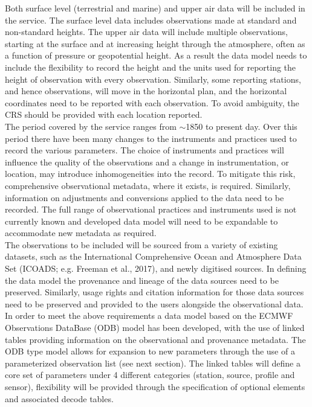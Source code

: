 \documentclass[a4paper]{article}
\begin{document}
Both surface level (terrestrial and marine) and upper air data will be included in the service.  The surface level data includes observations made at standard and non-standard heights. The upper air data will include multiple observations, starting at the surface and at increasing height through the atmosphere, often as a function of pressure or geopotential height. As a result the data model needs to include the flexibility to record the height and the units used for reporting the height of observation with every observation. Similarly, some reporting stations, and hence observations, will move in the horizontal plan, and the horizontal coordinates need to be reported with each observation. To avoid ambiguity, the CRS should be provided with each location reported.\\

The period covered by the service ranges from $\sim$1850 to present day. Over this period there have been many changes to the instruments and practices used to record the various parameters. The choice of instruments and practices will influence the quality of the observations and a change in instrumentation, or location, may introduce inhomogeneities into the record.  To mitigate this risk, comprehensive observational metadata, where it exists, is required. Similarly, information on adjustments and conversions applied to the data need to be recorded. The full range of observational practices and instruments used is not currently known and developed data model will need to be expandable to accommodate new metadata as required.\\

The observations to be included will be sourced from a variety of existing datasets, such as the International Comprehensive Ocean and Atmosphere Data Set (ICOADS; e.g. Freeman et al., 2017), and newly digitised sources. In defining the data model the provenance and lineage of the data sources need to be preserved. Similarly, usage rights and citation information for those data sources need to be preserved and provided to the users alongside the observational data.\\

In order to meet the above requirements a data model based on the ECMWF Observations DataBase (ODB) model has been developed, with the use of linked tables providing information on the observational and provenance metadata. The ODB type model allows for expansion to new parameters through the use of a parameterized observation list (see next section). The linked tables will define a core set of parameters under 4 different categories (station, source, profile and sensor), flexibility will be provided through the specification of optional elements and associated decode tables.\\
\end{document}
